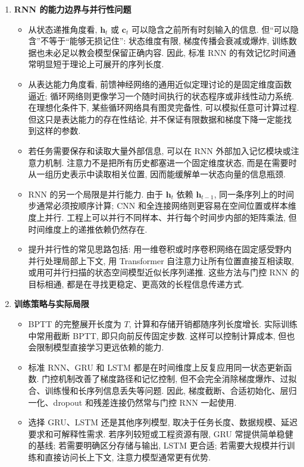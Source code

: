 \documentclass{../nndlcourse}
\begin{document}
\begin{enumerate}
\item \textbf{RNN 的能力边界与并行性问题}
  \begin{itemize}
    \item 从状态递推角度看, $\boldsymbol{h}_t$ 或 $\boldsymbol{c}_t$ 可以隐含之前所有时刻输入的信息. 但“可以隐含”不等于“能够无损记住”: 状态维度有限, 梯度传播会衰减或爆炸, 训练数据也未必足以教会模型保留正确内容. 因此, 标准 RNN 的有效记忆时间通常明显短于理论上可展开的序列长度.
    \item 从表达能力角度看, 前馈神经网络的通用近似定理讨论的是固定维度函数逼近; 循环网络则更像学习一个随时间执行的状态程序或非线性动力系统. 在理想化条件下, 某些循环网络具有图灵完备性, 可以模拟任意可计算过程. 但这只是表达能力的存在性结论, 并不保证有限数据和梯度下降一定能找到这样的参数.
    \item 若任务需要保存和读取大量外部信息, 可以在 RNN 外部加入记忆模块或注意力机制. 注意力不是把所有历史都塞进一个固定维度状态, 而是在需要时从一组历史表示中读取相关位置, 因而能缓解单一状态向量的信息瓶颈.
    \item RNN 的另一个局限是并行能力. 由于 $\boldsymbol{h}_t$ 依赖 $\boldsymbol{h}_{t-1}$, 同一条序列上的时间步通常必须按顺序计算; CNN 和全连接网络则更容易在空间位置或样本维度上并行. 工程上可以并行不同样本、并行每个时间步内部的矩阵乘法, 但时间维度上的递推依赖仍然存在.
    \item 提升并行性的常见思路包括: 用一维卷积或时序卷积网络在固定感受野内并行处理局部上下文, 用 Transformer 自注意力让所有位置直接互相读取, 或用可并行扫描的状态空间模型近似长序列递推. 这些方法与门控 RNN 的目标相通, 都是在寻找更稳定、更高效的长程信息传递方式.
  \end{itemize}

\item \textbf{训练策略与实际局限}
  \begin{itemize}
    \item BPTT 的完整展开长度为 $T$, 计算和存储开销都随序列长度增长. 实际训练中常用截断 BPTT, 即只向前反传固定步数. 这样可以控制计算成本, 但也会限制模型直接学习更远依赖的能力.
    \item 标准 RNN、GRU 和 LSTM 都是在时间维度上反复应用同一状态更新函数. 门控机制改善了梯度路径和记忆控制, 但不会完全消除梯度爆炸、过拟合、训练慢和长序列信息丢失等问题. 因此, 梯度截断、合适初始化、层归一化、dropout 和残差连接仍然常与门控 RNN 一起使用.
    \item 选择 GRU、LSTM 还是其他序列模型, 取决于任务长度、数据规模、延迟要求和可解释性需求. 若序列较短或工程资源有限, GRU 常提供简单稳健的基线; 若需要明确区分存储与输出, LSTM 更合适; 若需要大规模并行训练和直接访问长上下文, 注意力模型通常更有优势.
  \end{itemize}
\end{enumerate}
\end{document}
